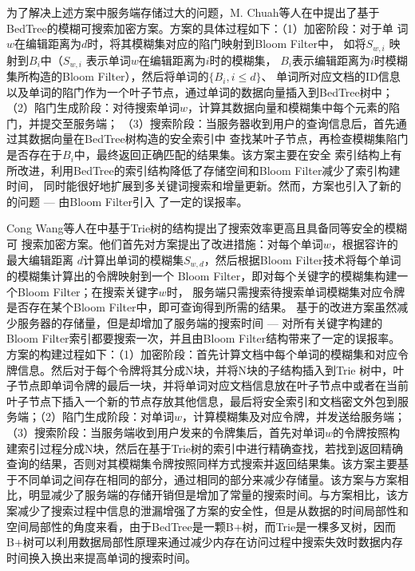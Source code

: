 为了解决上述方案中服务端存储过大的问题，M. Chuah等人在\cite{chuah2011privacy}中提出了基于
BedTree\cite{zhang2010bed}的模糊可搜索加密方案。方案的具体过程如下：（1）加密阶段：对于单
词$w$在编辑距离为$d$时，将其模糊集对应的陷门映射到Bloom Filter中，
如将$S_{w,i}$ 映射到$B_i$中（$S_{w,i}$ 表示单词$w$在编辑距离为$i$时的模糊集，
$B_i$表示编辑距离为$i$时模糊集所构造的Bloom Filter），然后将单词的$ \{B_i, i \leq d \}$、
单词所对应文档的ID信息以及单词的陷门作为一个叶子节点，通过单词的数据向量插入到BedTree树中；
（2）陷门生成阶段：对待搜索单词$w$，计算其数据向量和模糊集中每个元素的陷门，并提交至服务端；
（3）搜索阶段：当服务器收到用户的查询信息后，首先通过其数据向量在BedTree树构造的安全索引中
查找某叶子节点，再检查模糊集陷门是否存在于$B_i$中，最终返回正确匹配的结果集。该方案主要在安全
索引结构上有所改进，利用BedTree的索引结构降低了存储空间和Bloom Filter减少了索引构建时间，
同时能很好地扩展到多关键词搜索和增量更新。然而，方案也引入了新的的问题 --- 由Bloom Filter引入
了一定的误报率。

Cong Wang等人在\cite{wang2012achieving}中基于Trie树的结构提出了搜索效率更高且具备同等安全的模糊可
搜索加密方案。他们首先对方案\cite{li2010fuzzy}提出了改进措施：对每个单词$w$，根据容许的最大编辑距离
$d$计算出单词的模糊集$S_{w,d}$，然后根据Bloom Filter技术将每个单词的模糊集计算出的令牌映射到一个
Bloom Filter，即对每个关键字的模糊集构建一个Bloom Filter；在搜索关键字$w$时，
服务端只需搜索待搜索单词模糊集对应令牌是否存在某个Bloom Filter中，即可查询得到所需的结果。
基于\cite{li2010fuzzy}的改进方案虽然减少服务器的存储量，但是却增加了服务端的搜索时间 ---
对所有关键字构建的Bloom Filter索引都要搜索一次，并且由Bloom Filter结构带来了一定的误报率。
方案的构建过程如下：（1）加密阶段：首先计算文档中每个单词的模糊集和对应令牌信息。然后对于每个令牌将其分成N块，并将N块的子结构插入到Trie 树中，叶子节点即单词令牌的最后一块，并将单词对应文档信息放在叶子节点中或者在当前叶子节点下插入一个新的节点存放其他信息，最后将安全索引和文档密文外包到服务端；（2）陷门生成阶段：对单词$w$，计算模糊集及对应令牌，并发送给服务端；（3）搜索阶段：当服务端收到用户发来的令牌集后，首先对单词$w$的令牌按照构建索引过程分成N块，然后在基于Trie树的索引中进行精确查找，若找到返回精确查询的结果，否则对其模糊集令牌按照同样方式搜索并返回结果集。该方案主要基于不同单词之间存在相同的部分，通过相同的部分来减少存储量。该方案与方案\cite{li2010fuzzy}相比，明显减少了服务端的存储开销但是增加了常量的搜索时间。与方案\cite{chuah2011privacy}相比，该方案减少了搜索过程中信息的泄漏增强了方案的安全性，但是从数据的时间局部性和空间局部性的角度来看，由于BedTree是一颗B+树，而Trie是一棵多叉树，因而B+树可以利用数据局部性原理来通过减少内存在访问过程中搜索失效时数据内存时间换入换出来提高单词的搜索时间。

